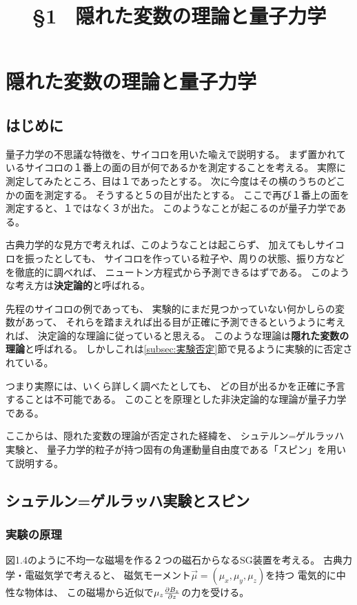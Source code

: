 \documentclass[a4paper, 10pt]{jsarticle}
\title{\S 1 \ 隠れた変数の理論と量子力学}
\author{}
\begin{document}
\maketitle

\section{隠れた変数の理論と量子力学}
\subsection{はじめに}\label{subsec:はじめに}
量子力学の不思議な特徴を、サイコロを用いた喩えで説明する。
まず置かれているサイコロの１番上の面の目が何であるかを測定することを考える。
実際に測定してみたところ、目は１であったとする。
次に今度はその横のうちのどこかの面を測定する。
そうすると５の目が出たとする。
ここで再び１番上の面を測定すると、１ではなく３が出た。
このようなことが起こるのが量子力学である。

古典力学的な見方で考えれば、このようなことは起こらず、
加えてもしサイコロを振ったとしても、
サイコロを作っている粒子や、周りの状態、振り方などを徹底的に調べれば、
ニュートン方程式から予測できるはずである。
このような考え方は\textbf{決定論的}と呼ばれる。

先程のサイコロの例であっても、
実験的にまだ見つかっていない何かしらの変数があって、
それらを踏まえれば出る目が正確に予測できるというように考えれば、
決定論的な理論に従っていると思える。
このような理論は\textbf{隠れた変数の理論}と呼ばれる。
しかしこれは\ref{subsec:実験否定}節で見るように実験的に否定されている。

つまり実際には、いくら詳しく調べたとしても、
どの目が出るかを正確に予言することは不可能である。
このことを原理とした非決定論的な理論が量子力学である。

ここからは、隠れた変数の理論が否定された経緯を、
シュテルン=ゲルラッハ実験と、
量子力学的粒子が持つ固有の角運動量自由度である「スピン」を用いて説明する。

\subsection{シュテルン=ゲルラッハ実験とスピン}\label{subsec:SG実験}
\subsubsection{実験の原理}
図1.4のように不均一な磁場を作る２つの磁石からなるSG装置を考える。
古典力学・電磁気学で考えると、
磁気モーメント$\vec{\mu} = (\mu_x, \mu_y, \mu_z)$を持つ
電気的に中性な物体は、
この磁場から近似で$\mu_z \frac{\partial B_z}{\partial z}$の力を受ける。
\end{document}
